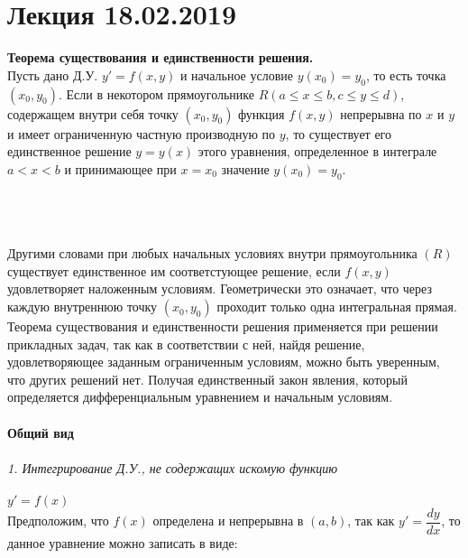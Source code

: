 \documentclass{article}
\numberwithin{equation}{section}
\begin{document}
\section{Лекция 18.02.2019}
\textbf{Теорема существования и единственности решения.}\\
Пусть дано Д.У. $y'=f(x,y)$ и начальное условие $y(x_0)=y_0$, то есть точка $(x_0,y_0)$. Если в некотором прямоугольнике $R(a\leqslant x\leqslant b, c\leqslant y\leqslant d)$, содержащем внутри себя точку $(x_0,y_0)$ функция $f(x,y)$ непрерывна по $x$ и $y$ и имеет ограниченную частную производную по $y$, то существует его единственное решение $y=y(x)$ этого уравнения, определенное в интеграле $a<x<b$ и принимающее при $x=x_0$ значение $y(x_0)=y_0$.\\\\
\\\\
Другими словами при любых начальных условиях внутри прямоугольника $(R)$ существует единственное им соответстующее решение, если $f(x,y)$ удовлетворяет наложенным условиям.
Геометрически это означает, что через каждую внутреннюю точку $(x_0,y_0)$ проходит только одна интегральная прямая.\\
Теорема существования и единственности решения применяется при решении прикладных задач, так как в соответствии с ней, найдя решение, удовлетворяющее заданным ограниченным условиям, можно быть уверенным, что других решений нет. Получая единственный закон явления, который определяется дифференциальным уравнением и начальным условиям.\\\\
\textbf{Общий вид}\\\\
\textit{1. Интегрирование Д.У., не содержащих искомую функцию}\\\\
$y'=f(x)$\\
Предположим, что $f(x)$ определена и непрерывна в $(a,b)$, так как $y'=\dfrac{dy}{dx}$, то данное уравнение можно записать в виде:\\
\end{document}
